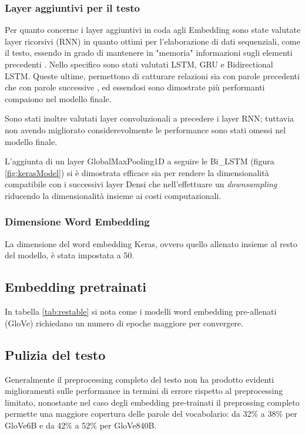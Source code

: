 \subsubsection{Layer aggiuntivi per il testo}

Per quanto concerne i layer aggiuntivi in coda agli Embedding sono state
valutate layer ricorsivi (RNN) in quanto ottimi per l'elaborazione di dati
sequenziali, come il testo, essendo in grado di mantenere in "memoria"
informazioni sugli elementi precedenti \cite{liang2017text}. Nello specifico
sono stati valutati LSTM, GRU e Bidirectional LSTM. Queste ultime, permettono di
catturare relazioni sia con parole precedenti che con parole successive
\cite{schuster1997bidirectional}, ed essendosi sono dimostrate più performanti
compaiono nel modello finale.

Sono stati inoltre valutati layer convoluzionali a precedere i layer RNN; tuttavia
non avendo migliorato considerevolmente le performance sono stati omessi nel
modello finale.

L'aggiunta di un layer GlobalMaxPooling1D a seguire le Bi\_LSTM (figura
\ref{fig:kerasModel}) si è dimostrata efficace sia per rendere la dimensionalità
compatibile con i successivi layer Densi che nell'effettuare un
\textit{downsampling} riducendo la dimensionalità insieme ai costi
computazionali.

\subsubsection{Dimensione Word Embedding}
La dimensione del word embedding Keras, ovvero quello allenato insieme al resto
del modello, è stata impostata a 50.

\subsection{Embedding pretrainati}
In tabella \ref{tab:restable} si nota come i modelli word embedding
pre-allenati (GloVe) richiedano un numero di epoche maggiore per convergere.

\subsection{Pulizia del testo}

Generalmente il preprocessing completo del testo non ha prodotto evidenti
miglioramenti sulle performance in termini di errore rispetto al preprocessing
limitato, nonostante nel caso degli embedding pre-trainati il preprossing
completo permette una maggiore copertura delle parole del vocabolario: da 32\%
a 38\% per GloVe6B e da 42\% a 52\% per GloVe840B.

